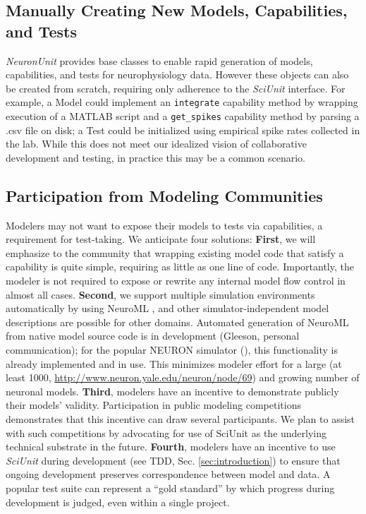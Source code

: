 \documentclass{frontiersSCNS}
\let\verbx\lstinline
\begin{document}
\subsection{Manually Creating New Models, Capabilities, and Tests}
\textit{NeuronUnit} provides base classes to enable rapid generation of models, capabilities, and tests for neurophysiology data. 
However these objects can also be created from scratch, requiring only adherence to the \textit{SciUnit} interface. 
For example, a Model could implement an \verbx{integrate} capability method by wrapping execution of a MATLAB script and a \verbx{get_spikes} capability method by parsing a .csv file on disk; 
a Test could be initialized using empirical spike rates collected in the lab.  
While this does not meet our idealized vision of collaborative development and testing, in practice this may be a common scenario. 

\subsection{Participation from Modeling Communities}
Modelers may not want to expose their models to tests via capabilities, a requirement for test-taking.  
We anticipate four solutions: \textbf{First}, we will emphasize to the community that wrapping existing model code that satisfy a capability is quite simple, requiring as little as one line of code. 
Importantly, the modeler is not required to expose or rewrite any internal model flow control in almost all cases. 
\textbf{Second}, we support multiple simulation environments automatically by using NeuroML \citep{gleeson_neuroml:_2010}, and other simulator-independent model descriptions are possible for other domains. 
Automated generation of NeuroML from native model source code is in development (Gleeson, personal communication); for the popular NEURON simulator (\cite{carnevale_neuron_2006}), this functionality is already implemented and in use. 
This minimizes modeler effort for a large (at least 1000, \url{http://www.neuron.yale.edu/neuron/node/69}) and growing number of neuronal models. 
\textbf{Third}, modelers have an incentive to demonstrate publicly their models' validity. 
Participation in public modeling competitions demonstrates that this incentive can draw several participants. We plan to assist with such competitions by advocating for use of SciUnit as the underlying technical substrate in the future. 
\textbf{Fourth}, modelers have an incentive to use \textit{SciUnit} during development (see TDD, Sec. \ref{sec:introduction}) to ensure that ongoing development preserves correspondence between model and data. 
A popular test suite can represent a ``gold standard'' by which progress during development is judged, even within a single project.
\end{document}
